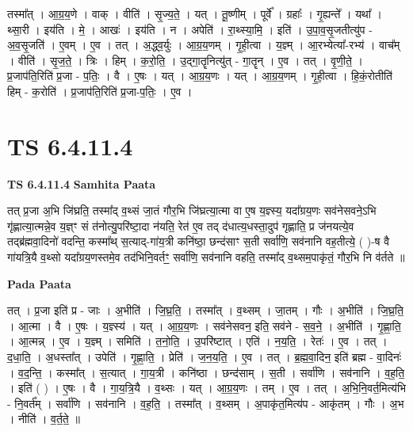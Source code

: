 \documentclass[17pt]{extarticle}
\begin{document}
तस्मा᳚त् । आ॒ग्र॒य॒णे । वाक् । वीति॑ । सृ॒ज्य॒ते॒ । यत् । तू॒ष्णीम् । पूर्वे᳚ । ग्रहाः᳚ । गृ॒ह्यन्ते᳚ । यथा᳚ । थ्सा॒री । इय॑ति । मे॒ । आखः॑ । इय॑ति । न । अपेति॑ । रा॒थ्स्या॒मि॒ । इति॑ । उ॒पा॒व॒सृ॒जतीत्यु॑प - अ॒व॒सृ॒जति॑ । ए॒वम् । ए॒व । तत् । अ॒द्ध्व॒र्युः । आ॒ग्र॒य॒णम् । गृ॒ही॒त्वा । य॒ज्ञ्म् । आ॒रभ्येत्या᳚-रभ्य॑ । वाच᳚म् । वीति॑ । सृ॒ज॒ते॒ । त्रिः । हिम् । क॒रो॒ति॒ । उ॒द्गा॒तॄनित्यु॑त् - गा॒तॄन् । ए॒व । तत् । वृ॒णी॒ते॒ । प्र॒जाप॑ति॒रिति॑ प्र॒जा - प॒तिः॒ । वै । ए॒षः । यत् । आ॒ग्र॒य॒णः । यत् । आ॒ग्र॒य॒णम् । गृ॒ही॒त्वा । हि॒कं॒रोतीति॑ हिम् - क॒रोति॑ । प्र॒जाप॑ति॒रिति॑ प्र॒जा-प॒तिः॒ । ए॒व ।  \newline





\section{ TS 6.4.11.4 }

\textbf{TS 6.4.11.4 } \newline
\textbf{Samhita Paata} \newline

तत् प्र॒जा अ॒भि जि॑घ्रति॒ तस्मा᳚द् व॒थ्सं जा॒तं गौर॒भि जि॑घ्रत्या॒त्मा वा ए॒ष य॒ज्ञ्स्य॒ यदा᳚ग्रय॒णः सव॑नेसवने॒ऽभि गृ॑ह्णात्या॒त्मन्ने॒व य॒ज्ञ्ꣳ सं त॑नोत्यु॒परि॑ष्टा॒दा न॑यति॒ रेत॑ ए॒व तद् द॑धात्य॒धस्ता॒दुप॑ गृह्णाति॒ प्र ज॑नयत्ये॒व तद्ब्र॑ह्मवा॒दिनो॑ वदन्ति॒ कस्मा᳚थ् स॒त्याद्-गा॑य॒त्री कनि॑ष्ठा॒ छन्द॑साꣳ स॒ती सर्वा॑णि॒ सव॑नानि वह॒तीत्ये॒ ( )-ष वै गा॑यत्रि॒यै व॒थ्सो यदा᳚ग्रय॒णस्तमे॒व तद॑भिनि॒वर्तꣳ॒॒ सर्वा॑णि॒ सव॑नानि वहति॒ तस्मा᳚द् व॒थ्सम॒पाकृ॑तं॒ गौर॒भि नि व॑र्तते ॥ \newline

\textbf{Pada Paata} \newline

तत् । प्र॒जा इति॑ प्र - जाः । अ॒भीति॑ । जि॒घ्र॒ति॒ । तस्मा᳚त् । व॒थ्सम् । जा॒तम् । गौः । अ॒भीति॑ । जि॒घ्र॒ति॒ । आ॒त्मा । वै । ए॒षः । य॒ज्ञ्स्य॑ । यत् । आ॒ग्र॒य॒णः । सव॑नेसवन॒ इति॒ सव॑ने - स॒व॒ने॒ । अ॒भीति॑ । गृ॒ह्णा॒ति॒ । आ॒त्मन्न् । ए॒व । य॒ज्ञ्म् । समिति॑ । त॒नो॒ति॒ । उ॒परि॑ष्टात् । एति॑ । न॒य॒ति॒ । रेतः॑ । ए॒व । तत् । द॒धा॒ति॒ । अ॒धस्ता᳚त् । उपेति॑ । गृ॒ह्णा॒ति॒ । प्रेति॑ । ज॒न॒य॒ति॒ । ए॒व । तत् । ब्र॒ह्म॒वा॒दिन॒ इति॑ ब्रह्म - वा॒दिनः॑ । व॒द॒न्ति॒ । कस्मा᳚त् । स॒त्यात् । गा॒य॒त्री । कनि॑ष्ठा । छन्द॑साम् । स॒ती । सर्वा॑णि । सव॑नानि । व॒ह॒ति॒ । इति॑ ( ) । ए॒षः । वै । गा॒य॒त्रि॒यै । व॒थ्सः । यत् । आ॒ग्र॒य॒णः । तम् । ए॒व । तत् । अ॒भि॒नि॒वर्त॒मित्य॑भि - नि॒वर्त᳚म् । सर्वा॑णि । सव॑नानि । व॒ह॒ति॒ । तस्मा᳚त् । व॒थ्सम् । अ॒पाकृ॑त॒मित्य॑प - आकृ॑तम् । गौः । अ॒भ । नीति॑ । व॒र्त॒ते॒ ॥  \newline
\end{document}
